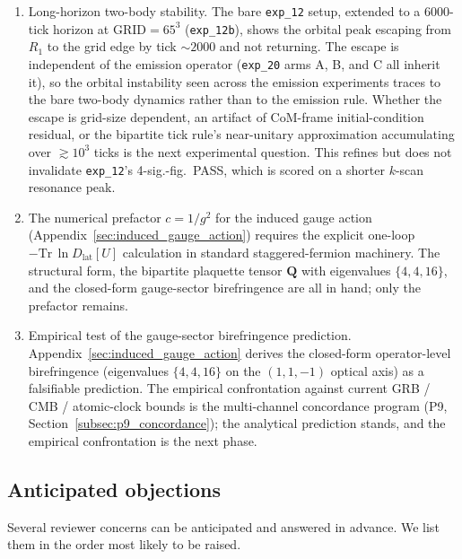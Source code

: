 \begin{enumerate}
\item \label{item:long_horizon_stability}
Long-horizon two-body stability.  The bare \texttt{exp\_12} setup,
extended to a 6000-tick horizon at $\text{GRID} = 65^3$
(\texttt{exp\_12b}), shows the orbital peak escaping from $R_1$ to
the grid edge by tick $\sim 2000$ and not returning.  The escape is
independent of the emission operator (\texttt{exp\_20} arms A, B,
and C all inherit it), so the orbital instability seen across the
emission experiments traces to the bare two-body dynamics rather
than to the emission rule.  Whether the escape is grid-size
dependent, an artifact of CoM-frame initial-condition residual, or
the bipartite tick rule's near-unitary approximation accumulating
over $\gtrsim 10^3$ ticks is the next experimental question.  This
refines but does not invalidate \texttt{exp\_12}'s 4-sig.-fig.\
PASS, which is scored on a shorter $k$-scan resonance peak.

\item The numerical prefactor $c = 1/g^2$ for the induced gauge
action (Appendix~\ref{sec:induced_gauge_action}) requires the
explicit one-loop $-\mathrm{Tr}\,\ln D_\text{lat}[U]$ calculation in
standard staggered-fermion machinery.  The structural form, the
bipartite plaquette tensor $\mathbf{Q}$ with eigenvalues
$\{4, 4, 16\}$, and the closed-form gauge-sector birefringence are
all in hand; only the prefactor remains.

\item Empirical test of the gauge-sector birefringence prediction.
Appendix~\ref{sec:induced_gauge_action} derives the closed-form
operator-level birefringence (eigenvalues $\{4, 4, 16\}$ on the
$(1,1,-1)$ optical axis) as a falsifiable prediction.  The
empirical confrontation against current GRB / CMB / atomic-clock
bounds is the multi-channel concordance program (P9,
Section~\ref{subsec:p9_concordance}); the analytical prediction
stands, and the empirical confrontation is the next phase.

\end{enumerate}

\subsection*{Anticipated objections}
\label{subsec:anticipated_objections}

Several reviewer concerns can be anticipated and answered in advance.
We list them in the order most likely to be raised.

